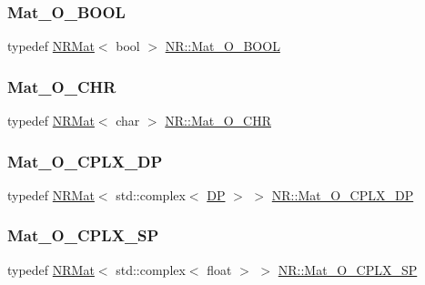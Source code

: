\mbox{\label{namespaceNR_af6c2362243608fcb5bf9c0d347209d80}} 
\subsubsection{\texorpdfstring{Mat\_O\_BOOL}{Mat\_O\_BOOL}}
{\footnotesize\ttfamily typedef \mbox{\hyperlink{classNR_1_1NRMat}{N\+R\+Mat}}$<$ bool $>$ \mbox{\hyperlink{namespaceNR_af6c2362243608fcb5bf9c0d347209d80}{N\+R\+::\+Mat\+\_\+\+O\+\_\+\+B\+O\+OL}}}

\mbox{\label{namespaceNR_a018b6abc03718b84730383f05f4dba29}} 
\subsubsection{\texorpdfstring{Mat\_O\_CHR}{Mat\_O\_CHR}}
{\footnotesize\ttfamily typedef \mbox{\hyperlink{classNR_1_1NRMat}{N\+R\+Mat}}$<$ char $>$ \mbox{\hyperlink{namespaceNR_a018b6abc03718b84730383f05f4dba29}{N\+R\+::\+Mat\+\_\+\+O\+\_\+\+C\+HR}}}

\mbox{\label{namespaceNR_afb08c6dc458497ae43e0905f29e1e752}} 
\subsubsection{\texorpdfstring{Mat\_O\_CPLX\_DP}{Mat\_O\_CPLX\_DP}}
{\footnotesize\ttfamily typedef \mbox{\hyperlink{classNR_1_1NRMat}{N\+R\+Mat}}$<$ std\+::complex$<$ \mbox{\hyperlink{namespaceNR_af6ff762dd605ff477b8e52387253a02a}{DP}} $>$ $>$ \mbox{\hyperlink{namespaceNR_afb08c6dc458497ae43e0905f29e1e752}{N\+R\+::\+Mat\+\_\+\+O\+\_\+\+C\+P\+L\+X\+\_\+\+DP}}}

\mbox{\label{namespaceNR_a591476e0092fbdc3941716455dfe1391}} 
\subsubsection{\texorpdfstring{Mat\_O\_CPLX\_SP}{Mat\_O\_CPLX\_SP}}
{\footnotesize\ttfamily typedef \mbox{\hyperlink{classNR_1_1NRMat}{N\+R\+Mat}}$<$ std\+::complex$<$ float $>$ $>$ \mbox{\hyperlink{namespaceNR_a591476e0092fbdc3941716455dfe1391}{N\+R\+::\+Mat\+\_\+\+O\+\_\+\+C\+P\+L\+X\+\_\+\+SP}}}

